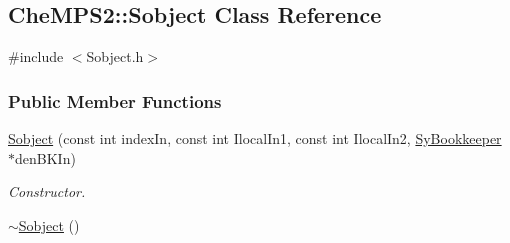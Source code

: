 \hypertarget{classCheMPS2_1_1Sobject}{\subsection{Che\-M\-P\-S2\-:\-:Sobject Class Reference}
\label{classCheMPS2_1_1Sobject}
}


{\ttfamily \#include $<$Sobject.\-h$>$}

\subsubsection*{Public Member Functions}
\begin{DoxyCompactItemize}
\item 
\hyperlink{classCheMPS2_1_1Sobject_a6fd85753dc9048918065a424c42846d2}{Sobject} (const int index\-In, const int Ilocal\-In1, const int Ilocal\-In2, \hyperlink{classCheMPS2_1_1SyBookkeeper}{Sy\-Bookkeeper} $\ast$den\-B\-K\-In)
\begin{DoxyCompactList}\small\item\em Constructor. \end{DoxyCompactList}\item 
\hypertarget{classCheMPS2_1_1Sobject_a96e39bf1063bb31010cc5c753599f827}{\hyperlink{classCheMPS2_1_1Sobject_a96e39bf1063bb31010cc5c753599f827}{$\sim$\-Sobject} ()}\label{classCheMPS2_1_1Sobject_a96e39bf1063bb31010cc5c753599f827}


\end{DoxyCompactItemize}
